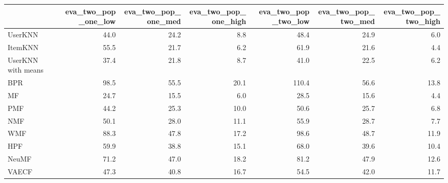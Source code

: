 \begin{tabular}{lrrrrrr}
\toprule
{} &  eva\_two\_pop\_one\_low &  eva\_two\_pop\_one\_med &  eva\_two\_pop\_one\_high &  eva\_two\_pop\_two\_low &  eva\_two\_pop\_two\_med &  eva\_two\_pop\_two\_high \\
\midrule
UserKNN            &                 44.0 &                 24.2 &                   8.8 &                 48.4 &                 24.9 &                   6.0 \\
ItemKNN            &                 55.5 &                 21.7 &                   6.2 &                 61.9 &                 21.6 &                   4.4 \\
UserKNN with means &                 37.4 &                 21.8 &                   8.7 &                 41.0 &                 22.5 &                   6.2 \\
BPR                &                 98.5 &                 55.5 &                  20.1 &                110.4 &                 56.6 &                  13.8 \\
MF                 &                 24.7 &                 15.5 &                   6.0 &                 28.5 &                 15.6 &                   4.4 \\
PMF                &                 44.2 &                 25.3 &                  10.0 &                 50.6 &                 25.7 &                   6.8 \\
NMF                &                 50.1 &                 28.0 &                  11.1 &                 55.9 &                 28.7 &                   7.7 \\
WMF                &                 88.3 &                 47.8 &                  17.2 &                 98.6 &                 48.7 &                  11.9 \\
HPF                &                 59.9 &                 38.8 &                  15.1 &                 68.0 &                 39.6 &                  10.4 \\
NeuMF              &                 71.2 &                 47.0 &                  18.2 &                 81.2 &                 47.9 &                  12.6 \\
VAECF              &                 47.3 &                 40.8 &                  16.7 &                 54.5 &                 42.0 &                  11.7 \\
\bottomrule
\end{tabular}
